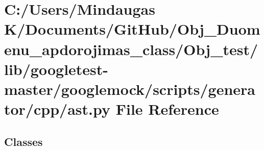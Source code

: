 \hypertarget{_obj__test_2lib_2googletest-master_2googlemock_2scripts_2generator_2cpp_2ast_8py}{}\section{C\+:/\+Users/\+Mindaugas K/\+Documents/\+Git\+Hub/\+Obj\+\_\+\+Duomenu\+\_\+apdorojimas\+\_\+class/\+Obj\+\_\+test/lib/googletest-\/master/googlemock/scripts/generator/cpp/ast.py File Reference}
\label{_obj__test_2lib_2googletest-master_2googlemock_2scripts_2generator_2cpp_2ast_8py}
\subsection*{Classes}
